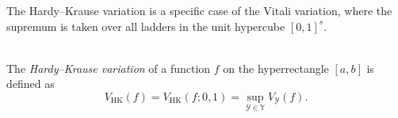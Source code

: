 The Hardy--Krause variation is a specific case of the Vitali variation, where the supremum is taken over all ladders in the unit hypercube $[0,1]^s$.

\begin{definition} \ \\
    The \emph{Hardy--Krause variation} of a function $f$ on the hyperrectangle
    $[a,b]$ is defined as
    \begin{equation*}
        V_{\mathrm{HK}}(f) = V_{\mathrm{HK}}(f; 0, 1) = \sup_{\mathcal{Y} \in 
        \mathbb{Y}} V_\mathcal{Y}(f).
    \end{equation*}
\end{definition}













